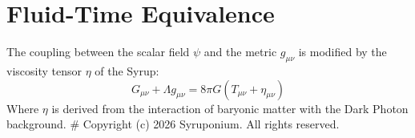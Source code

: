 \section{Fluid-Time Equivalence}
The coupling between the scalar field $\psi$ and the metric $g_{\mu\nu}$ is modified by the viscosity tensor $\eta$ of the Syrup:
\begin{equation}
    G_{\mu\nu} + \Lambda g_{\mu\nu} = 8\pi G (T_{\mu\nu} + \eta_{\mu\nu})
\end{equation}
Where $\eta$ is derived from the interaction of baryonic matter with the Dark Photon background.
# Copyright (c) 2026 Syruponium. All rights reserved.
